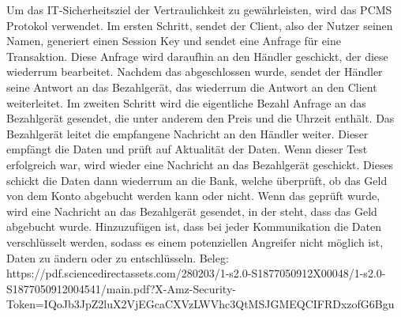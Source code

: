 Um das IT-Sicherheitsziel der Vertraulichkeit zu gewährleisten, wird das PCMS Protokol verwendet. 
Im ersten Schritt, sendet der Client, also der Nutzer seinen Namen, generiert einen Session Key 
und sendet eine Anfrage für eine Transaktion. Diese Anfrage wird daraufhin an den Händler geschickt,
der diese wiederrum bearbeitet. Nachdem das abgeschlossen wurde, sendet der Händler seine Antwort
an das Bezahlgerät, das wiederrum die Antwort an den Client weiterleitet. Im zweiten Schritt wird
die eigentliche Bezahl Anfrage an das Bezahlgerät gesendet, die unter anderem den Preis und die 
Uhrzeit enthält. Das Bezahlgerät leitet die empfangene Nachricht an den Händler weiter. 
Dieser empfängt die Daten und prüft auf Aktualität der Daten. Wenn dieser Test erfolgreich war, 
wird wieder eine Nachricht an das Bezahlgerät geschickt. Dieses schickt die Daten dann wiederrum 
an die Bank, welche überprüft, ob das Geld von dem Konto abgebucht werden kann oder nicht.
Wenn das geprüft wurde, wird eine Nachricht an das Bezahlgerät gesendet, in der steht, dass das
Geld abgebucht wurde. Hinzuzufügen ist, dass bei jeder Kommunikation die Daten verschlüsselt werden, 
sodass es einem potenziellen Angreifer nicht möglich ist, Daten zu ändern oder zu entschlüsseln.
Beleg: https://pdf.sciencedirectassets.com/280203/1-s2.0-S1877050912X00048/1-s2.0-S1877050912004541/main.pdf?X-Amz-Security-Token=IQoJb3JpZ2luX2VjEGcaCXVzLWVhc3QtMSJGMEQCIFRDxzofG6Bgu%



